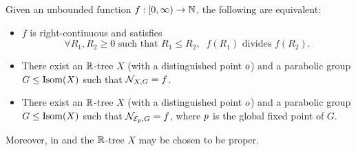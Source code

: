 \begin{theorem}
\label{theoremRtreeorbitalcounting}
Given an unbounded function $f:\CO 0\infty\to\N$, the following are equivalent:
\begin{itemize}
\item[(A)] $f$ is right-continuous and satisfies
\begin{equation}
\label{Rtreeorbitalcounting}
\forall R_1,R_2 \geq 0 \text{ such that } R_1\leq R_2, \;\; f(R_1)\text{ divides } f(R_2).
\end{equation}
\item[(B)] There exist an $\R$-tree $X$ (with a distinguished point $o$) and a parabolic group $G\leq\operatorname{Isom}(X)$ such that $\mathcal N_{X,G} = f$.
\item[(C)] There exist an $\R$-tree $X$ (with a distinguished point $o$) and a parabolic group $G\leq\operatorname{Isom}(X)$ such that $\mathcal N_{\mathcal E_p,G} = f$, where $p$ is the global fixed point of $G$.
\end{itemize}
Moreover, in  and  the $\R$-tree $X$ may be chosen to be proper.
\end{theorem}
